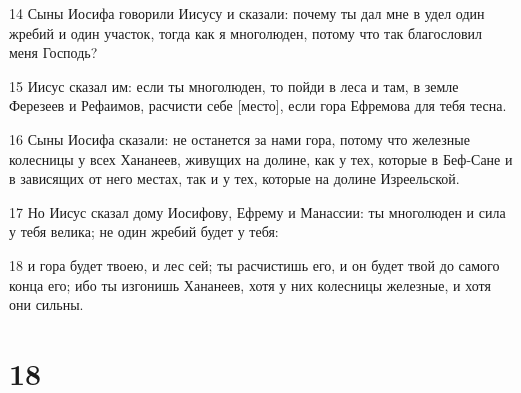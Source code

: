 \par 14 Сыны Иосифа говорили Иисусу и сказали: почему ты дал мне в удел один жребий и один участок, тогда как я многолюден, потому что так благословил меня Господь?
\par 15 Иисус сказал им: если ты многолюден, то пойди в леса и там, в земле Ферезеев и Рефаимов, расчисти себе [место], если гора Ефремова для тебя тесна.
\par 16 Сыны Иосифа сказали: не останется за нами гора, потому что железные колесницы у всех Хананеев, живущих на долине, как у тех, которые в Беф-Сане и в зависящих от него местах, так и у тех, которые на долине Изреельской.
\par 17 Но Иисус сказал дому Иосифову, Ефрему и Манассии: ты многолюден и сила у тебя велика; не один жребий будет у тебя:
\par 18 и гора будет твоею, и лес сей; ты расчистишь его, и он будет твой до самого конца его; ибо ты изгонишь Хананеев, хотя у них колесницы железные, и хотя они сильны.

\chapter{18}

